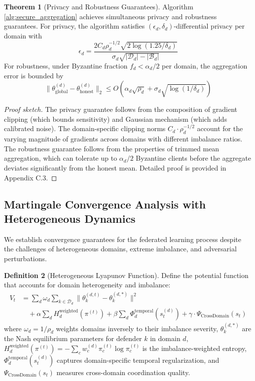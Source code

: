 \documentclass[12pt,a4paper]{article}
\theoremstyle{definition}
\newtheorem{theorem}{Theorem}[section]
\newtheorem{definition}[theorem]{Definition}
\newcommand{\D}{\mathcal{D}}
\newcommand{\B}{\mathcal{B}}
\begin{document}
\begin{theorem}[Privacy and Robustness Guarantees]
\label{thm:privacy_robustness}
Algorithm \ref{alg:secure_aggregation} achieves simultaneous privacy and robustness guarantees. For privacy, the algorithm satisfies $(\epsilon_d, \delta_d)$-differential privacy per domain with 
\begin{equation}
\epsilon_d = \frac{2C_d \rho_d^{-1/2} \sqrt{2\log(1.25/\delta_d)}}{\sigma_d\sqrt{|\D_d| - |\B_d|}}
\end{equation}
For robustness, under Byzantine fraction $f_d < \alpha_d/2$ per domain, the aggregation error is bounded by 
\begin{equation}
\|\theta_{\text{global}}^{(d)} - \theta_{\text{honest}}^{(d)}\|_2 \leq O\left(\alpha_d \sqrt{\rho_d} + \sigma_d \sqrt{\log(1/\delta_d)}\right)
\end{equation}
\end{theorem}

\begin{proof}[Proof sketch]
The privacy guarantee follows from the composition of gradient clipping (which bounds sensitivity) and Gaussian mechanism (which adds calibrated noise). The domain-specific clipping norms $C_d \cdot \rho_d^{-1/2}$ account for the varying magnitude of gradients across domains with different imbalance ratios. The robustness guarantee follows from the properties of trimmed mean aggregation, which can tolerate up to $\alpha_d/2$ Byzantine clients before the aggregate deviates significantly from the honest mean. Detailed proof is provided in Appendix C.3.
\end{proof}

\subsection{Martingale Convergence Analysis with Heterogeneous Dynamics}

We establish convergence guarantees for the federated learning process despite the challenges of heterogeneous domains, extreme imbalance, and adversarial perturbations.

\begin{definition}[Heterogeneous Lyapunov Function]
\label{def:lyapunov_function}
Define the potential function that accounts for domain heterogeneity and imbalance:
\begin{align}
V_t &= \sum_{d} \omega_d \sum_{k \in \D_d} \|\theta_k^{(d,t)} - \theta_k^{(d,*)}\|^2 \label{eq:lyapunov} \\
&\quad + \alpha \sum_{d} H_d^{\text{weighted}}(\pi^{(t)}) + \beta \sum_{d} \Phi_d^{\text{temporal}}(s_t^{(d)}) + \gamma \cdot \Psi_{\text{CrossDomain}}(s_t) \nonumber
\end{align}
where $\omega_d = 1/\rho_d$ weights domains inversely to their imbalance severity, $\theta_k^{(d,*)}$ are the Nash equilibrium parameters for defender $k$ in domain $d$, $H_d^{\text{weighted}}(\pi^{(t)}) = -\sum_c w_c^{(d)} \pi_c^{(t)} \log \pi_c^{(t)}$ is the imbalance-weighted entropy, $\Phi_d^{\text{temporal}}(s_t^{(d)})$ captures domain-specific temporal regularization, and $\Psi_{\text{CrossDomain}}(s_t)$ measures cross-domain coordination quality.
\end{definition}
\end{document}
